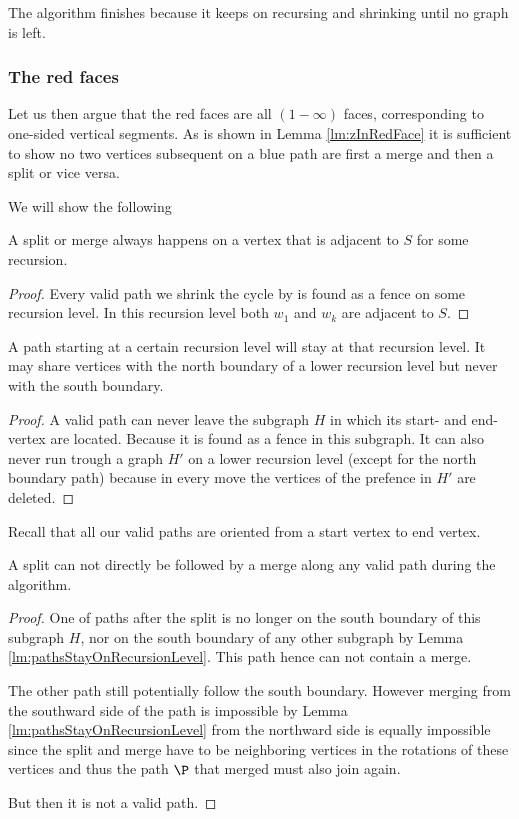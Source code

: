   The algorithm finishes because it keeps on recursing and shrinking until no graph is left.

  \subsubsection{The red faces}
  Let us then argue that the red faces are all $(1-\infty)$ faces, corresponding to one-sided vertical segments. As is shown in Lemma \ref{lm:zInRedFace} it is sufficient to show no two vertices subsequent on a blue path are first a merge and then a split or vice versa.

  We will show the following
  \begin{lemma}
    A split or merge always happens on a vertex that is adjacent to $S$ for some recursion.
  \end{lemma}

  \begin{proof}
    Every valid path we shrink the cycle by is found as a fence on some recursion level. In this recursion level both $w_1$ and $w_k$ are adjacent to $S$.
  \end{proof}

  \begin{lemma}
    \label{lm:pathsStayOnRecursionLevel}
    A path starting at a certain recursion level will stay at that recursion level. It may share vertices with the north boundary of a lower recursion level but never with the south boundary.
  \end{lemma}
  \begin{proof}
    A valid path can never leave the subgraph $H$ in which its start- and end-vertex are located. Because it is found as a fence in this subgraph. It can also never run trough a graph $H'$ on a lower recursion level (except for the north boundary path)  because in every move the vertices of the prefence in $H'$ are deleted.
  \end{proof}

  Recall that all our valid paths are oriented from a start vertex to end vertex.

  \begin{lemma}
    A split can not directly be followed by a merge along any valid path during the algorithm.
  \end{lemma}
  \begin{proof}
    One of paths after the split is no longer on the south boundary of this subgraph $H$, nor on the south boundary of any other subgraph by Lemma \ref{lm:pathsStayOnRecursionLevel}. This path hence can not contain a merge.

    The other path still potentially follow the south boundary. However merging from the southward side of the path is impossible by Lemma \ref{lm:pathsStayOnRecursionLevel} from the northward side is equally impossible since the split and merge have to be neighboring vertices in the rotations of these vertices and thus the path $\P$ that merged must also join again.

    But then it is not a valid path.
  \end{proof}

